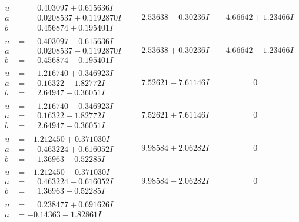 \documentclass[1p]{elsarticle_modified}
\theoremstyle{definition}
\begin{document}
$$\begin{array}{c|c|c}
\begin{aligned}
u &= \phantom{-}0.403097 + 0.615636 I \\
a &= \phantom{-}0.0208537 + 0.1192870 I \\
b &= \phantom{-}0.456874 + 0.195401 I\end{aligned}
 & \phantom{-}2.53638 - 0.30236 I & \phantom{-}4.66642 + 1.23466 I \\ \hline\begin{aligned}
u &= \phantom{-}0.403097 - 0.615636 I \\
a &= \phantom{-}0.0208537 - 0.1192870 I \\
b &= \phantom{-}0.456874 - 0.195401 I\end{aligned}
 & \phantom{-}2.53638 + 0.30236 I & \phantom{-}4.66642 - 1.23466 I \\ \hline\begin{aligned}
u &= \phantom{-}1.216740 + 0.346923 I \\
a &= \phantom{-}0.16322 - 1.82772 I \\
b &= \phantom{-}2.64947 + 0.36051 I\end{aligned}
 & \phantom{-}7.52621 - 7.61146 I & \phantom{-0.000000 } 0 \\ \hline\begin{aligned}
u &= \phantom{-}1.216740 - 0.346923 I \\
a &= \phantom{-}0.16322 + 1.82772 I \\
b &= \phantom{-}2.64947 - 0.36051 I\end{aligned}
 & \phantom{-}7.52621 + 7.61146 I & \phantom{-0.000000 } 0 \\ \hline\begin{aligned}
u &= -1.212450 + 0.371030 I \\
a &= \phantom{-}0.463224 + 0.616052 I \\
b &= \phantom{-}1.36963 - 0.52285 I\end{aligned}
 & \phantom{-}9.98584 + 2.06282 I & \phantom{-0.000000 } 0 \\ \hline\begin{aligned}
u &= -1.212450 - 0.371030 I \\
a &= \phantom{-}0.463224 - 0.616052 I \\
b &= \phantom{-}1.36963 + 0.52285 I\end{aligned}
 & \phantom{-}9.98584 - 2.06282 I & \phantom{-0.000000 } 0 \\ \hline\begin{aligned}
u &= \phantom{-}0.238477 + 0.691626 I \\
a &= -0.14363 - 1.82861 I \\

\end{aligned}
\end{array}$$
\end{document}
